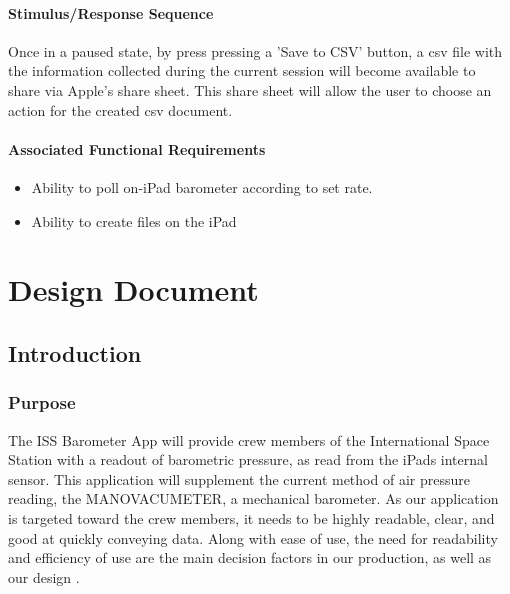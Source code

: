 \documentclass[onecolumn, draftclsnofoot,10pt, compsoc]{IEEEtran}
\def \CapstoneProjectName{ISS Barometer App }
\begin{document}
\paragraph{Stimulus/Response Sequence}
Once in a paused state, by press pressing a 'Save to CSV' button, a csv file with the information collected during the current session will become available to share via Apple's share sheet.
This share sheet will allow the user to choose an action for the created csv document.
\paragraph{Associated Functional Requirements}
\begin{itemize}
\item Ability to poll on-iPad barometer according to set rate.
\item Ability to create files on the iPad
\end{itemize}


\section{Design Document}

\subsection{Introduction}
\subsubsection{Purpose}
The \CapstoneProjectName will provide crew members of the International Space Station with a readout of barometric pressure, as read from the iPads internal sensor.
This application will supplement the current method of air pressure reading, the MANOVACUMETER, a mechanical barometer.
As our application is targeted toward the crew members, it needs to be highly readable, clear, and good at quickly conveying data.
Along with ease of use, the need for readability and efficiency of use are the main decision factors in our production, as well as our design \cite{probStat}.
\end{document}
